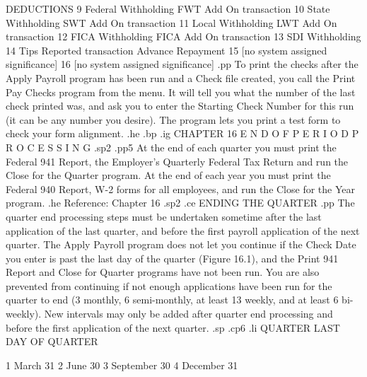  DEDUCTIONS  9		     Federal Withholding
			     FWT Add On transaction
	    10		     State Withholding
			     SWT Add On transaction
	    11		     Local Withholding
			     LWT Add On transaction
	    12		     FICA Withholding
			     FICA Add On transaction
	    13		     SDI Withholding
	    14		     Tips Reported transaction
			     Advance Repayment
	    15		     [no system assigned significance]
	    16		     [no system assigned significance]
.pp
To print the checks after the Apply Payroll program has been run and
a Check file created, you call the Print Pay Checks program from the menu.
It will tell you what the number of the last check printed was, and
ask you to enter the Starting Check Number for this run (it can be
any number you desire).  The program lets you print a test form
to check your form alignment.
.he
.bp
.ig
CHAPTER 16
E N D	O F   P E R I O D   P R O C E S S I N G
.sp2
.pp5
At the end of each quarter you must print the Federal 941 Report,
the Employer's Quarterly Federal Tax Return and run the Close
for the Quarter program.  At the end of each year you must print
the Federal 940 Report,  W-2 forms
for all employees, and run the Close for the Year program.
.he Reference: Chapter 16
.sp2
.ce
ENDING THE QUARTER
.pp
The quarter end processing steps must be undertaken sometime after
the last application of the last quarter, and before the first payroll
application of the next quarter.  The Apply Payroll program does not
let you continue if the Check Date you enter is past the last day
of the quarter (Figure 16.1), and the Print 941
Report and Close for Quarter programs
have not been run.  You are  also prevented from continuing if not enough
applications have been run for the quarter to end (3 monthly, 6 semi-monthly,
at least 13 weekly, and at least 6 bi-weekly).	New intervals may only
be added after quarter end processing and before the first application of
the next quarter.
.sp
.cp6
.li
	      QUARTER		LAST DAY OF QUARTER

		 1		    March 31
		 2		    June 30
		 3		    September 30
		 4		    December 31

